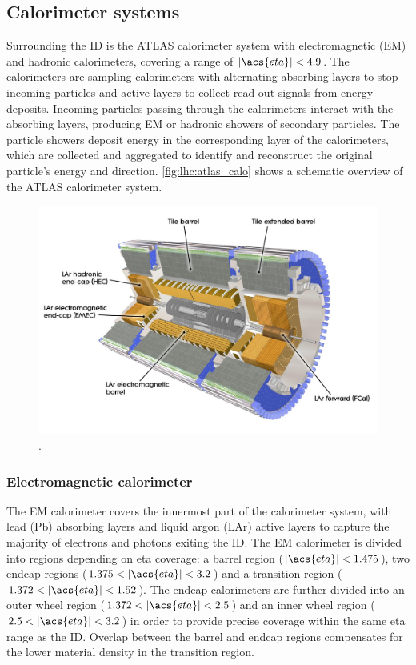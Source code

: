 \documentclass[../thesis.tex]{subfiles}
\begin{document}
\subsection{Calorimeter systems}
Surrounding the \acs{ID} is the ATLAS calorimeter system \citep{atlas} with electromagnetic (\acs{EM}) and hadronic calorimeters, covering a range of $|\acs{eta}|<4.9$. The calorimeters are sampling calorimeters with alternating absorbing layers to stop incoming particles and active layers to collect read-out signals from energy deposits. Incoming particles passing through the calorimeters interact with the absorbing layers, producing \acs{EM} or hadronic showers of secondary particles. The particle showers deposit energy in the corresponding layer of the calorimeters, which are collected and aggregated to identify and reconstruct the original particle's energy and direction. \autoref{fig:lhc:atlas_calo} shows a schematic overview of the ATLAS calorimeter system.

\begin{figure}[!htb]
\begin{center}
\includegraphics[width=0.7\linewidth]{fig/lhc_atlas_calorimeter.jpg}
\caption[Caption]{\label{fig:lhc:atlas_calo}\citep{lhc:atlas_calo}.}
\end{center}
\end{figure}

\subsubsection*{Electromagnetic calorimeter} 
The \acs{EM} calorimeter \citep{atlas} covers the innermost part of the calorimeter system, with lead (Pb) absorbing layers and liquid argon (\acs{LAr}) active layers to capture the majority of electrons and photons exiting the \acs{ID}. The \acs{EM} calorimeter is divided into regions depending on \acs{eta} coverage: a barrel region ($|\acs{eta}|<1.475$), two endcap regions ($1.375<|\acs{eta}|<3.2$) and a transition region ($1.372<|\acs{eta}|<1.52$). The endcap calorimeters are further divided into an outer wheel region ($1.372<|\acs{eta}|<2.5$) and an inner wheel region ($2.5<|\acs{eta}|<3.2$) in order to provide precise coverage within the same \acs{eta} range as the \acs{ID}. Overlap between the barrel and endcap regions compensates for the lower material density in the transition region.
\end{document}
